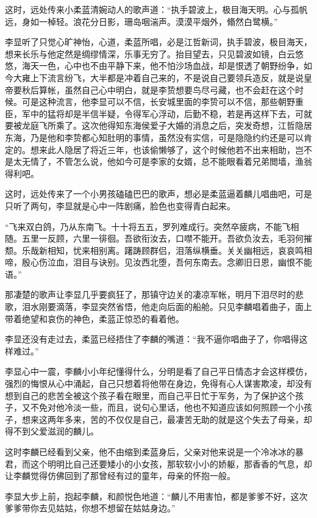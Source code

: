 这时，远处传来小柔蓝清婉动人的歌声道：“执手碧波上，极目海天明。心与孤帆远，身如一棹轻。浪花分日影，珊岛咽湍声。漠漠平烟外，翛然白鹭横。”

李显听了只觉心旷神怡，心道，柔蓝所唱，必是江哲新词，执手碧波，极目海天，想来长乐与他定然是绸缪情深，乐事无穷了。抬目望去，只见碧波如镜，白云悠悠，海天一色，心中也不由平静下来，他不怕沙场血战，却是恨透了朝野纷争，如今大雍上下流言纷飞，大半都是冲着自己来的，不是说自己要领兵造反，就是说皇帝要秋后算帐，虽然自己心中明白，就是李贽想要鸟尽弓藏，也不会赶在这个时候。可是这种流言，他李显可以不信，长安城里面的李贽可以不信，那些朝野重臣，军中的猛将却是半信半疑，令得军心浮动，后勤不稳，若是再这样下去，可就要被龙庭飞所乘了。这次他得知东海侯爱子大婚的消息之后，突发奇想，江哲隐居东海，乃是他和李贽都心知肚明的事情，虽然没有实信，可是隐隐约约还是可以肯定的。想来此人隐居了将近三年，也该偷懒够了，这个时候他若不出来相助，岂不是太无情了，不管怎么说，他如今可是李家的女婿，总不能眼看着兄弟閲墙，渔翁得利吧。

这时，远处传来了一个小男孩磕磕巴巴的歌声，想必是柔蓝逼着麟儿唱曲吧，可是只听了两句，李显就是心中一阵剧痛，脸色也变得青白起来。

“飞来双白鸽，乃从东南飞。十十将五五，罗列难成行。突然卒疲病，不能飞相随。五里一反顾，六里一徘徊。吾欲衔汝去，口噤不能开。吾欲负汝去，毛羽何摧颓。乐哉新相知，忧来相别离。躇踌顾群侣，泪落纵横垂。关关幽相远，哀哀鸣相啼，殷心伤泣血，泪目与诀别。见汝西北堕，吾何东南去。念卿旧日恩，幽恨不能语。”

那凄楚的歌声让李显几乎要疯狂了，那镇守边关的凄凉军帐，明月下泪尽时的悲歌，泪水刚要滴落，李显突然省悟，他走向后面的船舱。只见李麟唱着曲子，面上带着绝望和哀伤的神色，柔蓝正惊恐的看着他。

李显还没有走过去，柔蓝已经捂住了李麟的嘴道：“我不逼你唱曲子了，你唱得这样难过。”

李显心中一震，李麟小小年纪懂得什么，分明是看了自己平日情态才会这样模仿，强烈的悔恨从心中涌起，自己只想着将他带在身边，免得有心人谋害欺凌，却没有想到自己的悲苦全被这个孩子看在眼里，而自己平日忙于军务，为了保护这个孩子，又不免对他冷淡一些，而且，说句心里话，他也不知道应该如何照顾一个小孩子，想来这两年多来，苦的不仅仅是自己，最凄苦无助的就是这个失去了母亲，却得不到父爱滋润的麟儿。

这时李麟已经看到父亲，他不由缩到柔蓝身后，父亲对他来说是一个冷冰冰的暴君，而这个明明比自己还要矮小的小女孩，那软软小小的娇躯，那香香的气息，却让李麟觉得仿佛回到了那曾经有过的童年，母亲的怀抱一般。

李显大步上前，抱起李麟，和颜悦色地道：“麟儿不用害怕，都是爹爹不好，这次爹爹带你去见姑姑，你想不想留在姑姑身边。”

